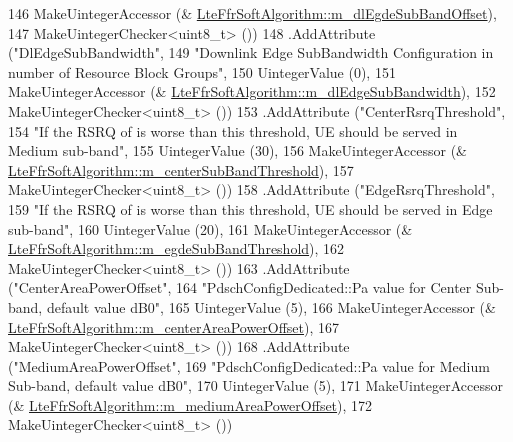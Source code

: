 \begin{DoxyCode}
146                    MakeUintegerAccessor (&
      \hyperlink{classns3_1_1LteFfrSoftAlgorithm_a2a697b9fee8b57c2bacba70a93828d8a}{LteFfrSoftAlgorithm::m\_dlEgdeSubBandOffset}),
147                    MakeUintegerChecker<uint8\_t> ())
148     .AddAttribute (\textcolor{stringliteral}{"DlEdgeSubBandwidth"},
149                    \textcolor{stringliteral}{"Downlink Edge SubBandwidth Configuration in number of Resource Block Groups"},
150                    UintegerValue (0),
151                    MakeUintegerAccessor (&
      \hyperlink{classns3_1_1LteFfrSoftAlgorithm_a756e59fc05e600fc8ce13a0b7f7adeff}{LteFfrSoftAlgorithm::m\_dlEdgeSubBandwidth}),
152                    MakeUintegerChecker<uint8\_t> ())
153     .AddAttribute (\textcolor{stringliteral}{"CenterRsrqThreshold"},
154                    \textcolor{stringliteral}{"If the RSRQ of is worse than this threshold, UE should be served in Medium sub-band"},
155                    UintegerValue (30),
156                    MakeUintegerAccessor (&
      \hyperlink{classns3_1_1LteFfrSoftAlgorithm_ac4ac7ef3bbd34f07e389f27acd3b688a}{LteFfrSoftAlgorithm::m\_centerSubBandThreshold}),
157                    MakeUintegerChecker<uint8\_t> ())
158     .AddAttribute (\textcolor{stringliteral}{"EdgeRsrqThreshold"},
159                    \textcolor{stringliteral}{"If the RSRQ of is worse than this threshold, UE should be served in Edge sub-band"},
160                    UintegerValue (20),
161                    MakeUintegerAccessor (&
      \hyperlink{classns3_1_1LteFfrSoftAlgorithm_a57371c026141c475aa45dac00ea08c1c}{LteFfrSoftAlgorithm::m\_egdeSubBandThreshold}),
162                    MakeUintegerChecker<uint8\_t> ())
163     .AddAttribute (\textcolor{stringliteral}{"CenterAreaPowerOffset"},
164                    \textcolor{stringliteral}{"PdschConfigDedicated::Pa value for Center Sub-band, default value dB0"},
165                    UintegerValue (5),
166                    MakeUintegerAccessor (&
      \hyperlink{classns3_1_1LteFfrSoftAlgorithm_ab97f616fab16eab204439acd039df16e}{LteFfrSoftAlgorithm::m\_centerAreaPowerOffset}),
167                    MakeUintegerChecker<uint8\_t> ())
168     .AddAttribute (\textcolor{stringliteral}{"MediumAreaPowerOffset"},
169                    \textcolor{stringliteral}{"PdschConfigDedicated::Pa value for Medium Sub-band, default value dB0"},
170                    UintegerValue (5),
171                    MakeUintegerAccessor (&
      \hyperlink{classns3_1_1LteFfrSoftAlgorithm_a4e720ede1d4d434abffd87a25495be59}{LteFfrSoftAlgorithm::m\_mediumAreaPowerOffset}),
172                    MakeUintegerChecker<uint8\_t> ())

\end{DoxyCode}
